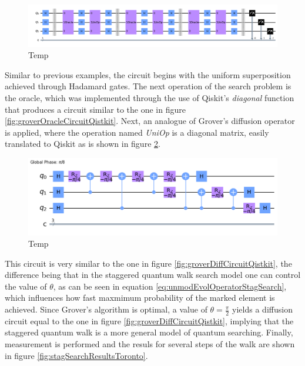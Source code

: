 \documentclass[../../dissertation.tex]{subfiles}
\begin{document}
\begin{figure}[!h]
	\centering
	\includegraphics[scale=0.35]{img/Qiskit/StaggeredQW/Search/Circuits/StagSearchCircuit_N3_M0_S3.png}
	\caption{Temp}
	\label{fig:stagSearchCircQistkit}
\end{figure}
Similar to previous examples, the circuit begins with the uniform superposition
achieved through Hadamard gates. The next operation of the search problem is
the oracle, which was implemented through the use of Qiskit's \textit{diagonal}
function that produces a circuit similar to the one in figure
\ref{fig:groverOracleCircuitQistkit}. Next, an analogue of Grover's diffusion
operator is applied, where the operation named \textit{UniOp} is a diagonal
matrix, easily translated to Qiskit as is shown in figure
\ref{fig:stagSearchUniOpCircQistkit}.  
\begin{figure}[!h]
	\centering
	\includegraphics[scale=0.40]{img/Qiskit/StaggeredQW/Search/Circuits/StagUniOpCircuit_N3_M0_S3.png}
	\caption{Temp}
	\label{fig:stagSearchUniOpCircQistkit}
\end{figure}
This circuit is very similar to the one in figure
\ref{fig:groverDiffCircuitQistkit}, the difference being that in the staggered
quantum walk search model one can control the value of $\theta$, as can be seen
in equation \ref{eq:unmodEvolOperatorStagSearch}, which influences how fast
maxmimum probability of the marked element is achieved. Since Grover's
algorithm is optimal, a value of $\theta=\frac{\pi}{2}$ yields a diffusion
circuit equal to the one in figure \ref{fig:groverDiffCircuitQistkit}, implying
that the staggered quantum walk is a more general model of quantum searching.
Finally, measurement is performed and the resuls for several steps of the walk
are shown in figure \ref{fig:stagSearchResultsToronto}.  
\end{document}
